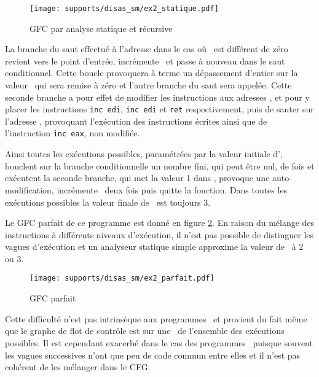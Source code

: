 \begin{figure}[h]
\begin{center}
\texttt{[image: supports/disas\_sm/ex2\_statique.pdf]}
\caption{GFC par analyse statique et récursive}
\label{fig:sm_cfg_statique}
\end{center}
\end{figure}


La branche du saut effectué à l'adresse  dans le cas où \eax\ est différent de zéro revient vers le point d'entrée, incrémente \eax\ et passe à nouveau dans le saut conditionnel. Cette boucle provoquera à terme un dépassement d'entier sur la valeur \eax\ qui sera remise à zéro et l'autre branche du saut sera appelée.
Cette seconde branche a pour effet de modifier les instructions aux adresses ,  et  pour y placer les instructions \texttt{inc edi}, \texttt{inc edi} et \texttt{ret} respectivement, puis de sauter sur l'adresse , provoquant l'exécution des instructions écrites ainsi que de l'instruction \texttt{inc eax}, non modifiée.

Ainsi toutes les exécutions possibles, paramétrées par la valeur initiale d'\eax, bouclent sur la branche conditionnelle un nombre fini, qui peut être nul, de fois et exécutent la seconde branche, qui met la valeur 1 dans \edi, provoque une auto-modification, incrémente \edi\ deux fois puis quitte la fonction. Dans toutes les exécutions possibles la valeur finale de \edi\ est toujours 3.

Le GFC parfait de ce programme est donné en figure \ref{fig:sm_cfg_parfait}. En raison du mélange des instructions à différents niveaux d'exécution, il n'est pas possible de distinguer les vagues d'exécution et un analyseur statique simple approxime la valeur de \edi\ à 2 ou 3.

\begin{figure}[h]
\begin{center}
  \texttt{[image: supports/disas\_sm/ex2\_parfait.pdf]}
\end{center}
\caption{GFC parfait}
\label{fig:sm_cfg_parfait}
\end{figure}



Cette difficulté n'est pas intrinsèque aux programmes \sm\ et provient du fait même que le graphe de flot de contrôle est sur une \sura\ de l'ensemble des exécutions possibles. Il est cependant exacerbé dans le cas des programmes \sm\ puisque souvent les vagues successives n'ont que peu de code commun entre elles et il n'est pas cohérent de les mélanger dans le CFG.

